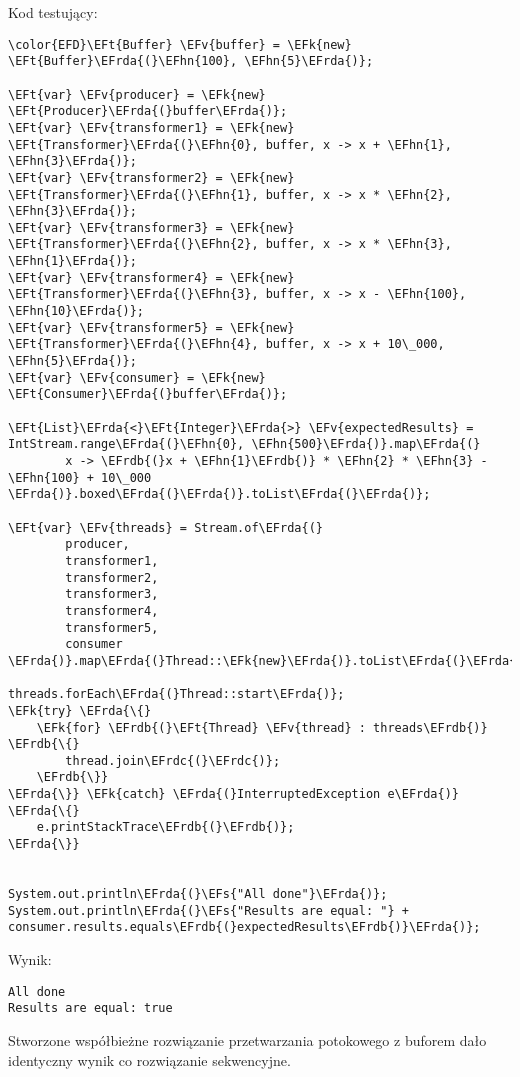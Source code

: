 \documentclass[11pt]{article}
\newcommand{\EFs}[1]{\textcolor{EFs}{#1}} %
\newcommand{\EFk}[1]{\textcolor{EFk}{#1}} %
\newcommand{\EFv}[1]{\textcolor{EFv}{#1}} %
\newcommand{\EFt}[1]{\textcolor{EFt}{#1}} %
\newcommand{\EFhn}[1]{\textcolor{EFhn}{#1}} %
\newcommand{\EFrda}[1]{#1} %
\newcommand{\EFrdb}[1]{\textcolor{EFrdb}{#1}} %
\newcommand{\EFrdc}[1]{\textcolor{EFrdc}{#1}} %
\begin{document}
Kod testujący:
\begin{Code}
\begin{Verbatim}
\color{EFD}\EFt{Buffer} \EFv{buffer} = \EFk{new} \EFt{Buffer}\EFrda{(}\EFhn{100}, \EFhn{5}\EFrda{)};

\EFt{var} \EFv{producer} = \EFk{new} \EFt{Producer}\EFrda{(}buffer\EFrda{)};
\EFt{var} \EFv{transformer1} = \EFk{new} \EFt{Transformer}\EFrda{(}\EFhn{0}, buffer, x -> x + \EFhn{1}, \EFhn{3}\EFrda{)};
\EFt{var} \EFv{transformer2} = \EFk{new} \EFt{Transformer}\EFrda{(}\EFhn{1}, buffer, x -> x * \EFhn{2}, \EFhn{3}\EFrda{)};
\EFt{var} \EFv{transformer3} = \EFk{new} \EFt{Transformer}\EFrda{(}\EFhn{2}, buffer, x -> x * \EFhn{3}, \EFhn{1}\EFrda{)};
\EFt{var} \EFv{transformer4} = \EFk{new} \EFt{Transformer}\EFrda{(}\EFhn{3}, buffer, x -> x - \EFhn{100}, \EFhn{10}\EFrda{)};
\EFt{var} \EFv{transformer5} = \EFk{new} \EFt{Transformer}\EFrda{(}\EFhn{4}, buffer, x -> x + 10\_000, \EFhn{5}\EFrda{)};
\EFt{var} \EFv{consumer} = \EFk{new} \EFt{Consumer}\EFrda{(}buffer\EFrda{)};

\EFt{List}\EFrda{<}\EFt{Integer}\EFrda{>} \EFv{expectedResults} = IntStream.range\EFrda{(}\EFhn{0}, \EFhn{500}\EFrda{)}.map\EFrda{(}
        x -> \EFrdb{(}x + \EFhn{1}\EFrdb{)} * \EFhn{2} * \EFhn{3} - \EFhn{100} + 10\_000
\EFrda{)}.boxed\EFrda{(}\EFrda{)}.toList\EFrda{(}\EFrda{)};

\EFt{var} \EFv{threads} = Stream.of\EFrda{(}
        producer,
        transformer1,
        transformer2,
        transformer3,
        transformer4,
        transformer5,
        consumer
\EFrda{)}.map\EFrda{(}Thread::\EFk{new}\EFrda{)}.toList\EFrda{(}\EFrda{)};

threads.forEach\EFrda{(}Thread::start\EFrda{)};
\EFk{try} \EFrda{\{}
    \EFk{for} \EFrdb{(}\EFt{Thread} \EFv{thread} : threads\EFrdb{)} \EFrdb{\{}
        thread.join\EFrdc{(}\EFrdc{)};
    \EFrdb{\}}
\EFrda{\}} \EFk{catch} \EFrda{(}InterruptedException e\EFrda{)} \EFrda{\{}
    e.printStackTrace\EFrdb{(}\EFrdb{)};
\EFrda{\}}


System.out.println\EFrda{(}\EFs{"All done"}\EFrda{)};
System.out.println\EFrda{(}\EFs{"Results are equal: "} + consumer.results.equals\EFrdb{(}expectedResults\EFrdb{)}\EFrda{)};
\end{Verbatim}
\end{Code}

Wynik:
\begin{tcolorbox}
\begin{Verbatim}
All done
Results are equal: true
\end{Verbatim}


\end{tcolorbox}Stworzone współbieżne rozwiązanie przetwarzania potokowego z buforem dało
identyczny wynik co rozwiązanie sekwencyjne.
\end{document}
